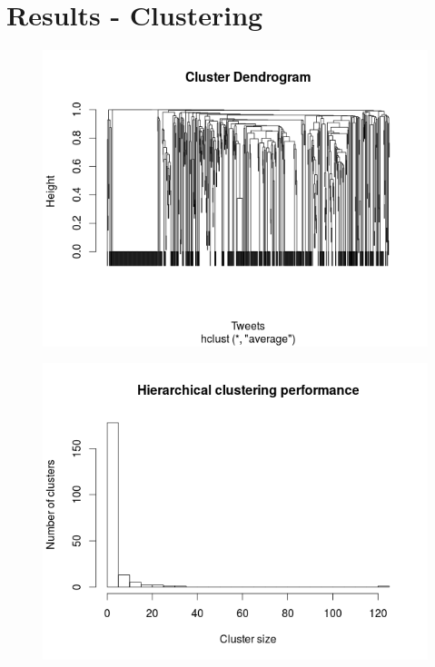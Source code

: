 	\section{Results - Clustering }
	 \begin{figure}[H]
	 	\centering
	 	\begin{minipage}{.7\linewidth}
	 		\includegraphics[width=\linewidth]{images/dendogram.png}
	 		\label{img5}
	 	\end{minipage}
	 \end{figure} 	
	 
	 \begin{figure}[H]
	 	\centering
	 	\begin{minipage}{.7\linewidth}
	 		\includegraphics[width=\linewidth]{images/size_of_clusters.png}
	 		\label{img6}
	 	\end{minipage}
	 \end{figure} 	
	 
